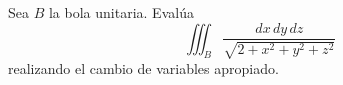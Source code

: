 Sea \( B \) la bola unitaria. Evalúa
\[
\iiint_B \frac{dx \, dy \, dz}{\sqrt{2 + x^2 + y^2 + z^2}}
\]
realizando el cambio de variables apropiado.
